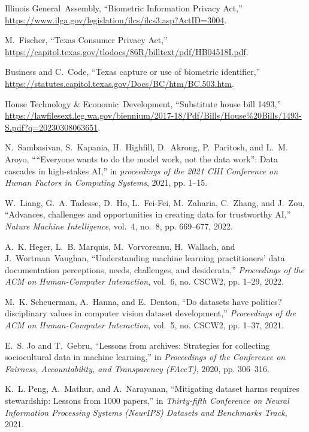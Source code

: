 \documentclass[journal]{IEEEtran}
\begin{document}
\begin{thebibliography}{100}
\relax Illinois General~Assembly, ``Biometric Information Privacy Act,''
\url{https://www.ilga.gov/legislation/ilcs/ilcs3.asp?ActID=3004}.

M.~Fischer, ``Texas Consumer Privacy Act,''
\url{https://capitol.texas.gov/tlodocs/86R/billtext/pdf/HB04518I.pdf}.

\relax Business and C.~Code, ``Texas capture or use of biometric identifier,''
\url{https://statutes.capitol.texas.gov/Docs/BC/htm/BC.503.htm}.

\relax House Technology \& Economic~Development, ``Substitute house bill
1493,''
\url{https://lawfilesext.leg.wa.gov/biennium/2017-18/Pdf/Bills/House\%20Bills/1493-S.pdf?q=20230308063651}.

N.~Sambasivan, S.~Kapania, H.~Highfill, D.~Akrong, P.~Paritosh, and L.~M.
Aroyo, ``“Everyone wants to do the model work, not the data work”: Data
cascades in high-stakes AI,'' in \emph{proceedings of the 2021 CHI Conference
on Human Factors in Computing Systems}, 2021, pp. 1--15.

W.~Liang, G.~A. Tadesse, D.~Ho, L.~Fei-Fei, M.~Zaharia, C.~Zhang, and J.~Zou,
``Advances, challenges and opportunities in creating data for trustworthy
AI,'' \emph{Nature Machine Intelligence}, vol.~4, no.~8, pp. 669--677, 2022.

A.~K. Heger, L.~B. Marquis, M.~Vorvoreanu, H.~Wallach, and J.~Wortman~Vaughan,
``Understanding machine learning practitioners' data documentation
perceptions, needs, challenges, and desiderata,'' \emph{Proceedings of the
ACM on Human-Computer Interaction}, vol.~6, no. CSCW2, pp. 1--29, 2022.

M.~K. Scheuerman, A.~Hanna, and E.~Denton, ``Do datasets have politics?
disciplinary values in computer vision dataset development,''
\emph{Proceedings of the ACM on Human-Computer Interaction}, vol.~5, no.
CSCW2, pp. 1--37, 2021.

E.~S. Jo and T.~Gebru, ``Lessons from archives: Strategies for collecting
sociocultural data in machine learning,'' in \emph{Proceedings of the
Conference on Fairness, Accountability, and Transparency (FAccT)}, 2020, pp.
306--316.

K.~L. Peng, A.~Mathur, and A.~Narayanan, ``Mitigating dataset harms requires
stewardship: Lessons from 1000 papers,'' in \emph{Thirty-fifth Conference on
Neural Information Processing Systems (NeurIPS) Datasets and Benchmarks Track}, 2021. 


\end{thebibliography}
\end{document}

